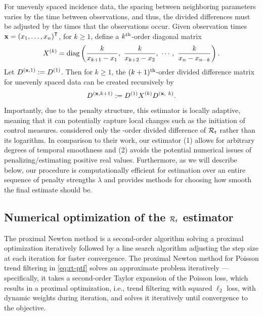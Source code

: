 For unevenly spaced incidence data, the spacing between neighboring parameters
varies by the time between observations, and thus, the divided differences must
be adjusted by the times that the observations occur.
Given observation times $\mathbf{x} = (x_1,\dots,x_n)^{\mathsf{T}}$, for $k \geq 1$, define a
$k^{\textnormal{th}}$-order diagonal matrix $$X^{(k)} = \diag \lr{\frac{k}{x_{k+1} - x_1},\ 
\frac{k}{x_{k+2} - x_2},\ \cdots,\ \frac{k}{x_n - x_{n-k}} }.$$ 
Let $D^{(\mathbf{x},1)} :=
D^{(1)}$. Then for $k\geq 1$, the $(k+1)^{\textnormal{th}}$-order divided difference matrix
for unevenly spaced data can be created recursively by
$$D^{(\bfx, k+1)} := D^{(1)} X^{(k)} D^{(\bfx,\ k)}.$$ 

Importantly, due to the penalty structure, this estimator is locally adaptive,
meaning that it can potentially capture local changes such as the initiation of
control measures. \cite{abry2020spatial,pascal2022nonsmooth} considered only the
\second-order divided difference of $\mathcal{R}_t$ rather than its logarithm. In
comparison to their work, our estimator (1) allows for arbitrary degrees of
temporal smoothness and (2) avoids the potential numerical issues of
penalizing/estimating positive real values. Furthermore, as we will describe
below, our procedure is computationally efficient for estimation over an entire
sequence of penalty strengths $\lambda$ and provides methods for choosing how
smooth the final estimate should be.

\subsection{Numerical optimization of the $\mathcal{R}_t$ estimator}


The proximal Newton method is a second-order algorithm solving a proximal optimization iteratively followed by a line search algorithm adjusting the step size at each iteration for faster convergence. The proximal Newton method for Poisson trend filtering in \eqref{eq:rt-ptf} solves an approximate problem iteratively --- specifically, it takes a second-order Taylor expansion of the Poisson loss, which results in a proximal optimization, i.e., trend filtering with squared $\ell_2$ loss, with dynamic weights during iteration, and solves it iteratively until convergence to the objective. 

